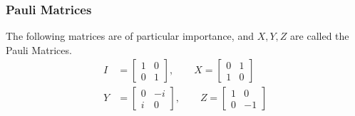 \documentclass{beamer}
\begin{document}
\begin{frame}
    \frametitle{Pauli Matrices}
    \begin{example}
        The following matrices are of particular importance, and $X, Y, Z$ are called the Pauli Matrices.
        \begin{align}
            \label{Pauli}
            I & =
            \begin{bmatrix}
                1 & 0 \\
                0 & 1
            \end{bmatrix}, \qquad
            X = \begin{bmatrix}
                0 & 1 \\
                1 & 0
            \end{bmatrix} \\
            Y & =
            \begin{bmatrix}
                0 & -i \\
                i & 0
            \end{bmatrix}, \qquad
            Z = \begin{bmatrix}
                1 & 0  \\
                0 & -1
            \end{bmatrix}
        \end{align}
    \end{example}
\end{frame}
\end{document}
